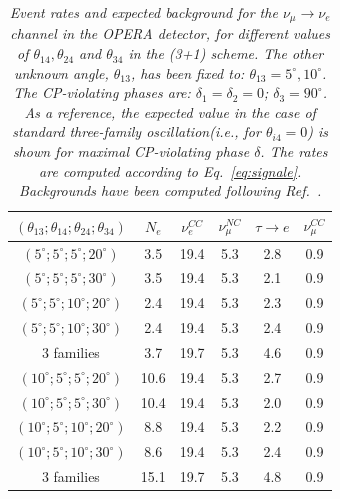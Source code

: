 \documentclass[12pt]{elsart}
\begin{document}
\begin{table}[t] \centering
    \begin{tabular}{|c|c|c|c|c|c|}
	\hline\hline
	$(\theta_{13}; \theta_{14}; \theta_{24}; \theta_{34})$ & $N_e$ & $\nu_e^{CC}$ & $\nu_\mu^{NC}$ & $\tau \to e$ & $\nu_\mu^{CC}$  \\ \hline
	$(5^\circ; 5^\circ; 5^\circ; 20^\circ)$   &  3.5 & 19.4 & 5.3 & 2.8 & 0.9 \\
	$(5^\circ; 5^\circ; 5^\circ; 30^\circ)$   &  3.5 & 19.4 & 5.3 & 2.1 & 0.9 \\
	$(5^\circ; 5^\circ; 10^\circ; 20^\circ)$  &  2.4 & 19.4 & 5.3 & 2.3 & 0.9 \\
	$(5^\circ; 5^\circ; 10^\circ; 30^\circ)$  &  2.4 & 19.4 & 5.3 & 2.4 & 0.9 \\
	3 families                        &  3.7 & 19.7 & 5.3 & 4.6 & 0.9 \\
	\hline
	$(10^\circ; 5^\circ; 5^\circ; 20^\circ)$  & 10.6 & 19.4 & 5.3 & 2.7 & 0.9 \\
	$(10^\circ; 5^\circ; 5^\circ; 30^\circ)$  & 10.4 & 19.4 & 5.3 & 2.0 & 0.9 \\
	$(10^\circ; 5^\circ; 10^\circ; 20^\circ)$ &  8.8 & 19.4 & 5.3 & 2.2 & 0.9 \\
	$(10^\circ; 5^\circ; 10^\circ; 30^\circ)$ &  8.6 & 19.4 & 5.3 & 2.4 & 0.9 \\
	3 families                        & 15.1 & 19.7 & 5.3 & 4.8 & 0.9 \\
	\hline \hline
    \end{tabular}
    \caption{\label{tab:rates2}\sl%
      Event rates and expected background for the $\nu_\mu \to \nu_e$
      channel in the OPERA detector, for different values of 
      $\theta_{14}, \theta_{24}$ and $\theta_{34}$ in the (3+1)
      scheme. The other unknown angle, $\theta_{13}$, has been fixed
      to: $\theta_{13} = 5^\circ, 10^\circ$. The CP-violating phases
      are: $\delta_1 = \delta_2 = 0$; $\delta_3 = 90^\circ$.  As a
      reference, the expected value in the case of standard
      three-family oscillation(\textit{i.e.}, for $\theta_{i4} = 0$) is shown
      for maximal CP-violating phase $\delta$.  The rates are computed
      according to Eq.~\eqref{eq:signale}. Backgrounds have been
      computed following Ref.~\cite{Komatsu:2002sz}.}
\end{table}
\end{document}
